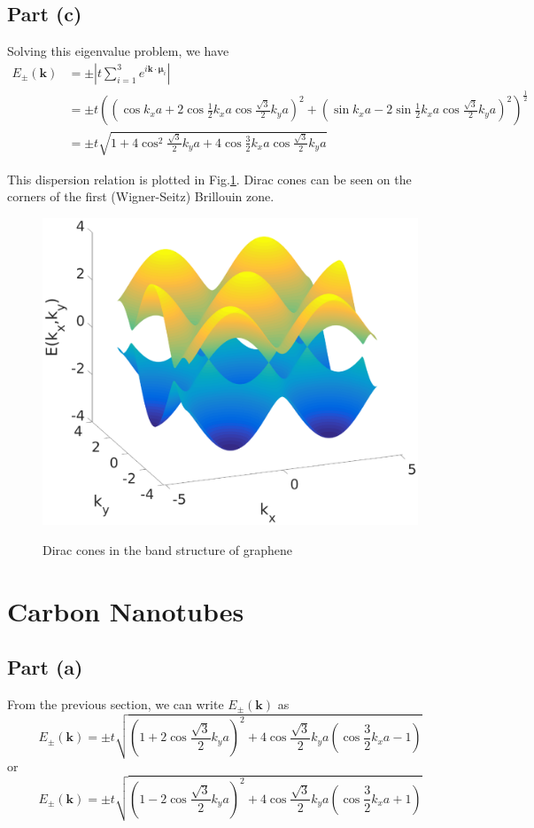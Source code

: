 \documentclass{article}
\begin{document}
\subsection{Part (c)}
Solving this eigenvalue problem, we have
\begin{align*}
	E_\pm(\mathbf{k})&=\pm\left|t\sum_{i=1}^3e^{i\mathbf{k}\cdot\bm{\mu}_i}\right|\\
	&=\pm t\left(\left(\cos k_xa+2\cos\frac{1}{2}k_xa\cos\frac{\sqrt{3}}{2}k_ya\right)^2+\left(\sin k_xa-2\sin\frac{1}{2}k_xa\cos\frac{\sqrt{3}}{2}k_ya\right)^2\right)^{\frac{1}{2}}\\
	&=\pm t\sqrt{1+4\cos^2\frac{\sqrt{3}}{2}k_ya+4\cos\frac{3}{2}k_xa\cos\frac{\sqrt{3}}{2}k_ya}
\end{align*}

This dispersion relation is plotted in Fig.\ref{Dirac}. Dirac cones can be seen on the corners of the first (Wigner-Seitz) Brillouin zone.
\begin{figure}[!htbp]
	\centering
	\includegraphics[width=12cm]{Dirac.eps}\\
	\caption{Dirac cones in the band structure of graphene}\label{Dirac}
\end{figure}

\section{Carbon Nanotubes}
\subsection{Part (a)}
From the previous section, we can write $E_\pm(\mathbf{k})$ as
\begin{equation}
	E_\pm(\mathbf{k})=\pm t\sqrt{\left(1+2\cos\frac{\sqrt{3}}{2}k_ya\right)^2+4\cos\frac{\sqrt{3}}{2}k_ya\left(\cos\frac{3}{2}k_xa-1\right)}\label{plus}
\end{equation}
or
\begin{equation}
	E_\pm(\mathbf{k})=\pm t\sqrt{\left(1-2\cos\frac{\sqrt{3}}{2}k_ya\right)^2+4\cos\frac{\sqrt{3}}{2}k_ya\left(\cos\frac{3}{2}k_xa+1\right)}\label{minus}
\end{equation}
\end{document}
